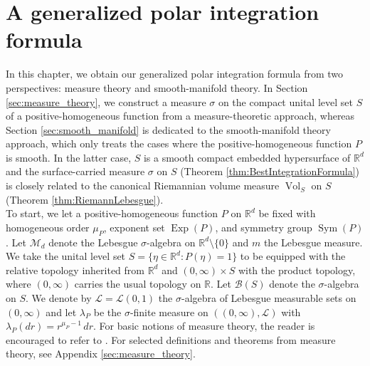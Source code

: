 \documentclass[11pt, letter]{book}
\newcommand\Sym{\operatorname{Sym}}
\newcommand\Exp{\operatorname{Exp}}
\newcommand{\Vol}{\operatorname{Vol}}
\begin{document}
\chapter{A generalized polar integration formula}\label{chap:formula}

In this chapter, we obtain our generalized polar integration formula from two perspectives: measure theory and smooth-manifold theory. In Section \ref{sec:measure_theory}, we construct a measure $\sigma$ on the compact unital level set $S$ of a positive-homogeneous function from a measure-theoretic approach, whereas Section \ref{sec:smooth_manifold} is dedicated to the smooth-manifold theory approach, which only treats the cases where the positive-homogeneous function $P$ is smooth. In the latter case, $S$ is a smooth compact embedded hypersurface of $\mathbb{R}^d$ and the surface-carried measure $\sigma$ on $S$ (Theorem \ref{thm:BestIntegrationFormula}) is closely related to the canonical Riemannian volume measure $\Vol_S$ on $S$ (Theorem \ref{thm:RiemannLebesgue}).\\

\noindent To start, we let a positive-homogeneous function $P$ on $\mathbb{R}^d$ be fixed with homogeneous order $\mu_P$, exponent set $\Exp(P)$, and symmetry group $\Sym{(P)}$. Let $\mathcal{M}_d$ denote the Lebesgue $\sigma$-algebra on $\mathbb{R}^d\setminus\{ 0 \}$ and $m$ the Lebesgue measure. We take the unital level set $S = \{ \eta\in \mathbb{R}^d : P(\eta) = 1 \}$ to be equipped with the relative topology inherited from $\mathbb{R}^d$ and $(0,\infty)\times S$ with the product topology, where $(0,\infty)$ carries the usual topology on $\mathbb{R}$. Let $\mathcal{B}(S)$ denote the $\sigma$-algebra on $S$. We denote by $\mathcal{L}=\mathcal{L}(0,1)$ the $\sigma$-algebra of Lebesgue measurable sets on $(0,\infty)$ and let $\lambda_P$ be the $\sigma$-finite measure on $((0,\infty),\mathcal{L})$ with $\lambda_P(dr)=r^{\mu_P-1}\,dr$. For basic notions of measure theory, the reader is encouraged to refer to \cite{bogachev_measure_2007}. For selected definitions and theorems from measure theory, see Appendix \ref{sec:measure_theory}.

\end{document}
